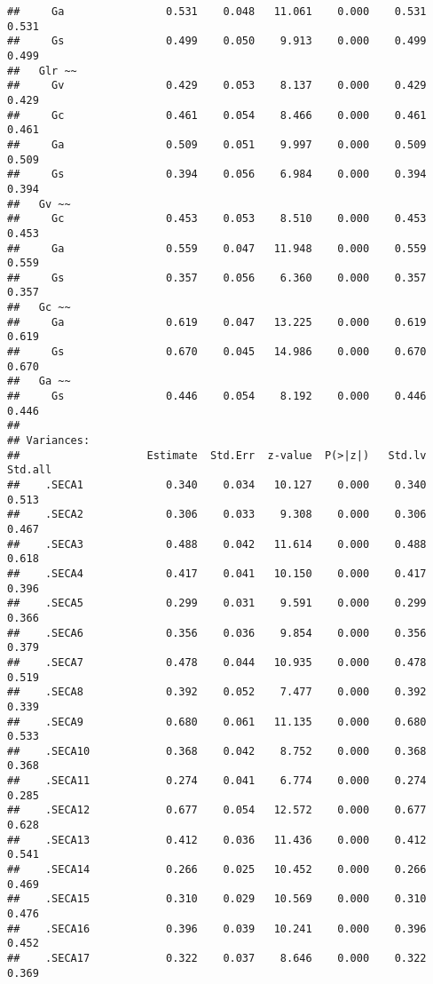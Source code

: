 \documentclass[
]{article}
\begin{document}
\begin{verbatim}
##     Ga                0.531    0.048   11.061    0.000    0.531    0.531
##     Gs                0.499    0.050    9.913    0.000    0.499    0.499
##   Glr ~~                                                                
##     Gv                0.429    0.053    8.137    0.000    0.429    0.429
##     Gc                0.461    0.054    8.466    0.000    0.461    0.461
##     Ga                0.509    0.051    9.997    0.000    0.509    0.509
##     Gs                0.394    0.056    6.984    0.000    0.394    0.394
##   Gv ~~                                                                 
##     Gc                0.453    0.053    8.510    0.000    0.453    0.453
##     Ga                0.559    0.047   11.948    0.000    0.559    0.559
##     Gs                0.357    0.056    6.360    0.000    0.357    0.357
##   Gc ~~                                                                 
##     Ga                0.619    0.047   13.225    0.000    0.619    0.619
##     Gs                0.670    0.045   14.986    0.000    0.670    0.670
##   Ga ~~                                                                 
##     Gs                0.446    0.054    8.192    0.000    0.446    0.446
## 
## Variances:
##                    Estimate  Std.Err  z-value  P(>|z|)   Std.lv  Std.all
##    .SECA1             0.340    0.034   10.127    0.000    0.340    0.513
##    .SECA2             0.306    0.033    9.308    0.000    0.306    0.467
##    .SECA3             0.488    0.042   11.614    0.000    0.488    0.618
##    .SECA4             0.417    0.041   10.150    0.000    0.417    0.396
##    .SECA5             0.299    0.031    9.591    0.000    0.299    0.366
##    .SECA6             0.356    0.036    9.854    0.000    0.356    0.379
##    .SECA7             0.478    0.044   10.935    0.000    0.478    0.519
##    .SECA8             0.392    0.052    7.477    0.000    0.392    0.339
##    .SECA9             0.680    0.061   11.135    0.000    0.680    0.533
##    .SECA10            0.368    0.042    8.752    0.000    0.368    0.368
##    .SECA11            0.274    0.041    6.774    0.000    0.274    0.285
##    .SECA12            0.677    0.054   12.572    0.000    0.677    0.628
##    .SECA13            0.412    0.036   11.436    0.000    0.412    0.541
##    .SECA14            0.266    0.025   10.452    0.000    0.266    0.469
##    .SECA15            0.310    0.029   10.569    0.000    0.310    0.476
##    .SECA16            0.396    0.039   10.241    0.000    0.396    0.452
##    .SECA17            0.322    0.037    8.646    0.000    0.322    0.369

\end{verbatim}
\end{document}
